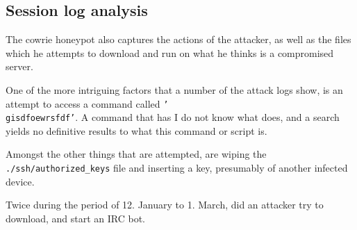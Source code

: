 \subsection{Session log analysis}
\label{sec:session_analysis}

    The cowrie honeypot also captures the actions of 
    the attacker, as well as the files which he attempts
    to download and run on what he thinks is a compromised
    server. 


    One of the more intriguing factors that a number of the
    attack logs show, is an attempt to access a command
    called \texttt{'\\gisdfoewrsfdf'}. A command that 
    has I do not know what does, and a search yields no
    definitive results to what this command or script is. 

    Amongst the other things that are attempted, 
    are wiping the \texttt{./ssh/authorized\_keys} file and
    inserting a key, presumably of another infected
    device. 

    Twice during the period of 12. January to 1. March, 
    did an attacker try to download, and start an IRC bot.

    